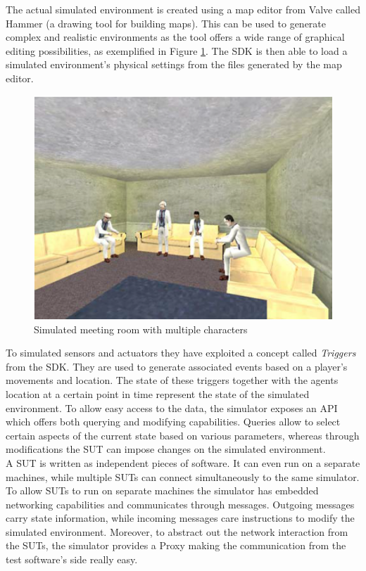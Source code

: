 The actual simulated environment is created using a map editor from Valve called Hammer (a drawing tool for building maps). This can be used to generate complex and realistic environments as the tool offers a wide range of graphical editing possibilities, as exemplified in Figure \ref{fig:tatus_simulated_meeting_room}. The SDK is then able to load a simulated environment's physical settings from the files generated by the map editor.\\

\begin{figure}[H]
	\centering
	\includegraphics[width=\linewidth]{gfx/Chapter2/tatus_simulated_meeting_room}
	\caption{Simulated meeting room with multiple characters}
	\label{fig:tatus_simulated_meeting_room}
\end{figure}

To simulated sensors and actuators they have exploited a concept called \emph{Triggers} from the SDK. They are used to generate associated events based on a player's movements and location. The state of these triggers together with the agents location at a certain point in time represent the state of the simulated environment. To allow easy access to the data, the simulator exposes an API which offers both querying and modifying capabilities. Queries allow to select certain aspects of the current state based on various parameters, whereas through modifications the SUT can impose changes on the simulated environment.\\

A SUT is written as independent pieces of software. It can even run on a separate machines, while multiple SUTs can connect simultaneously to the same simulator. To allow SUTs to run on separate machines the simulator has embedded networking capabilities and communicates through messages. Outgoing messages carry state information, while incoming messages care instructions to modify the simulated environment. Moreover, to abstract out the network interaction from the SUTs, the simulator provides a Proxy making the communication from the test software's side really easy.\\
